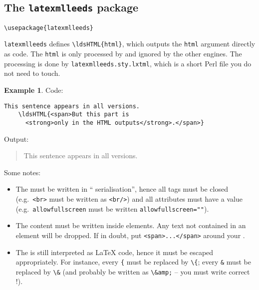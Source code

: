 \documentclass[a4paper]{article}
\def\ltxinline{\lstinline[style=latexml]}
\theoremstyle{definition}
\newtheorem{exa}{Example}[subsection]
\begin{document}
\subsection{The \texttt{latexmlleeds} package}
\label{sub:latexmlleeds-sty}
\begin{lstlisting}[style=latexml,caption={Import \texttt{latexmlleeds} in the preamble}]
  \usepackage{latexmlleeds}
\end{lstlisting}

\verb|latexmlleeds| defines \ltxinline|\ldsHTML{html}|, which outputs the \ltxinline|html| argument directly as \HTML{} code. The \ltxinline|html| is only processed by \LaTeXML{} and ignored by the other engines. The \LaTeXML{} processing is done by \verb|latexmlleeds.sty.lxtml|, which is a short Perl file you do not need to touch.
\begin{exa}
  Code:
  \begin{lstlisting}[style=latexml]
    This sentence appears in all versions.
    \ldsHTML{<span>But this part is
      <strong>only in the HTML outputs</strong>.</span>}
  \end{lstlisting}
  Output:
  \begin{quote}
    This sentence appears in all versions.
  \end{quote}
\end{exa}

Some notes:
\begin{itemize}
  \item The \HTML{} must be written in ``\XML{} serialisation'', hence all tags must be closed (e.g.\ \verb|<br>| must be written as \verb|<br/>|) and all attributes must have a value (e.g.\ \verb|allowfullscreen| must be written \verb|allowfullscreen=""|).
  \item The content must be written inside \HTML{} elements. Any text not contained in an element will be dropped. If in doubt, put \verb|<span>...</span>| around your \HTML{}.
  \item The \HTML{} is still interpreted as \LaTeX{} code, hence it must be escaped appropriately. For instance, every \ltxinline|{| must be replaced by \ltxinline|\{|; every \ltxinline|&| must be replaced by \ltxinline|\&| (and probably be written as \ltxinline|\&amp;| -- you must write correct \HTML{}!).
\end{itemize}
\end{document}
